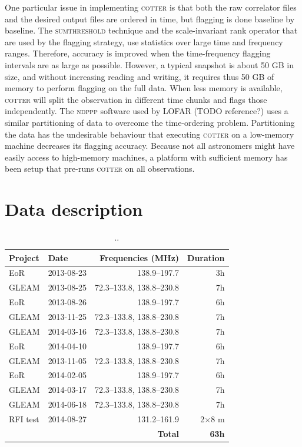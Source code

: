 \documentclass[useAMS,usenatbib]{mn2e}
\begin{document}
One particular issue in implementing \textsc{cotter} is that both the raw correlator files and the desired output files are ordered in time, but flagging is done baseline by baseline. The \textsc{sumthreshold} technique and the scale-invariant rank operator that are used by the flagging strategy, use statistics over large time and frequency ranges. Therefore, accuracy is improved when the time-frequency flagging intervals are as large as possible. However, a typical snapshot is about 50 GB in size, and without increasing reading and writing, it requires thus 50 GB of memory to perform flagging on the full data. When less memory is available, \textsc{cotter} will split the observation in different time chunks and flags those independently. The \textsc{ndppp} software used by LOFAR (TODO reference?) uses a similar partitioning of data to overcome the time-ordering problem. Partitioning the data has the undesirable behaviour that executing \textsc{cotter} on a low-memory machine decreases its flagging accuracy. Because not all astronomers might have easily access to high-memory machines, a platform with sufficient memory has been setup that pre-runs \textsc{cotter} on all observations.

\section{Data description}

\begin{table}
\caption{..}\label{tbl:obs-list}
\begin{tabular}{|l|l|r|r|}
\hline
\textbf{Project} &\textbf{Date} & \textbf{Frequencies (MHz)} & \textbf{Duration} \\
\hline
EoR   & 2013-08-23 & 138.9--197.7 & 3h\\
GLEAM & 2013-08-25 & 72.3--133.8, 138.8--230.8 & 7h \\
EoR   & 2013-08-26 & 138.9--197.7 & 6h \\
GLEAM & 2013-11-25 & 72.3--133.8, 138.8--230.8 & 7h \\
GLEAM & 2014-03-16 & 72.3--133.8, 138.8--230.8 & 7h \\
EoR   & 2014-04-10 & 138.9--197.7 & 6h \\
GLEAM & 2013-11-05 & 72.3--133.8, 138.8--230.8 & 7h \\
EoR   & 2014-02-05 & 138.9--197.7 & 6h\\
GLEAM & 2014-03-17 & 72.3--133.8, 138.8--230.8 & 7h\\
GLEAM & 2014-06-18 & 72.3--133.8, 138.8--230.8 & 7h \\
RFI test&2014-08-27& 131.2--161.9 & 2$\times$8 m \\
\hline
\multicolumn{3}{|r|}{\textbf{Total}} & \textbf{63h} \\
\hline
\end{tabular}
\end{table}
\end{document}
